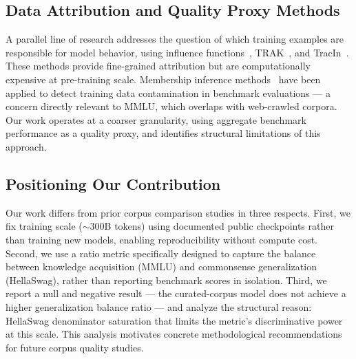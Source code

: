 \subsection{Data Attribution and Quality Proxy Methods}

A parallel line of research addresses the question of which training examples are responsible for model behavior, using influence functions~\cite{Koh2017Influence}, TRAK~\cite{Park2023TRAK}, and TracIn~\cite{Pruthi2020TracIn}. These methods provide fine-grained attribution but are computationally expensive at pre-training scale. Membership inference methods~\cite{shi2024detecting} have been applied to detect training data contamination in benchmark evaluations --- a concern directly relevant to MMLU, which overlaps with web-crawled corpora. Our work operates at a coarser granularity, using aggregate benchmark performance as a quality proxy, and identifies structural limitations of this approach.

\subsection{Positioning Our Contribution}

Our work differs from prior corpus comparison studies in three respects. First, we fix training scale ($\sim$300B tokens) using documented public checkpoints rather than training new models, enabling reproducibility without compute cost. Second, we use a ratio metric specifically designed to capture the balance between knowledge acquisition (MMLU) and commonsense generalization (HellaSwag), rather than reporting benchmark scores in isolation. Third, we report a null and negative result --- the curated-corpus model does not achieve a higher generalization balance ratio --- and analyze the structural reason: HellaSwag denominator saturation that limits the metric's discriminative power at this scale. This analysis motivates concrete methodological recommendations for future corpus quality studies.
